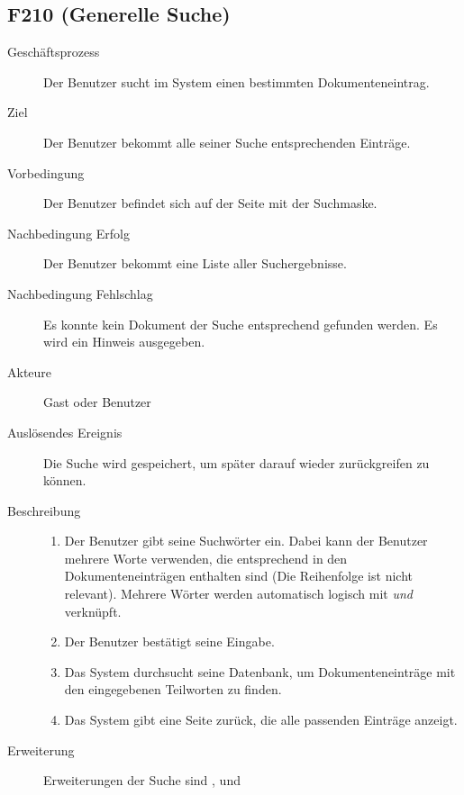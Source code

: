 \subsection{F210 (Generelle Suche)}
\label{F:Suche}
\begin{description}
  \item[Geschäftsprozess]Der Benutzer sucht im System einen bestimmten Dokumenteneintrag.
  \item[Ziel]Der Benutzer bekommt alle seiner Suche entsprechenden Einträge.
  \item[Vorbedingung]Der Benutzer befindet sich auf der Seite mit der Suchmaske.
  \item[Nachbedingung Erfolg]Der Benutzer bekommt eine Liste aller Suchergebnisse.
  \item[Nachbedingung Fehlschlag]Es konnte kein Dokument der Suche entsprechend gefunden werden. Es wird ein Hinweis ausgegeben.
  \item[Akteure]Gast oder Benutzer
  \item[Auslösendes Ereignis]Die Suche wird gespeichert, um später darauf wieder zurückgreifen zu können.
  \item[Beschreibung]\hfill
    \begin{enumerate}
      \item Der Benutzer gibt seine Suchwörter ein. Dabei kann der Benutzer mehrere Worte verwenden, die entsprechend in den Dokumenteneinträgen enthalten sind (Die Reihenfolge ist nicht relevant). Mehrere Wörter werden automatisch logisch mit \emph{und} verknüpft.
      \item Der Benutzer bestätigt seine Eingabe.
      \item Das System durchsucht seine Datenbank, um Dokumenteneinträge mit den eingegebenen Teilworten zu finden.
      \item Das System gibt eine Seite zurück, die alle passenden Einträge anzeigt.
    \end{enumerate}
    \item[Erweiterung]Erweiterungen der Suche sind ,  und 
\end{description}


